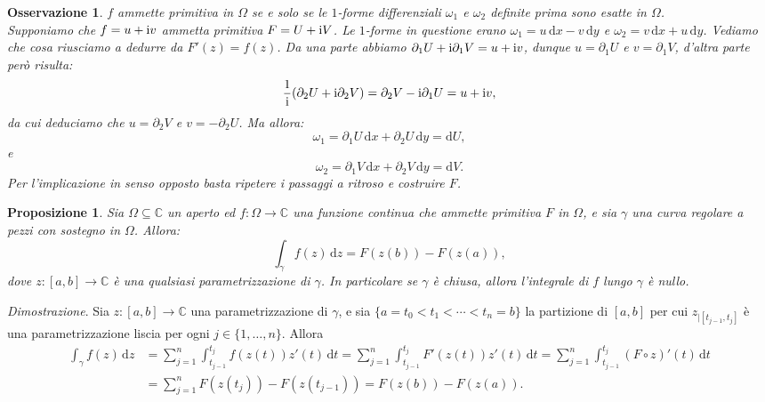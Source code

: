 \documentclass[11pt]{book}
\makeatletter
\theoremstyle{Definizione}
\theoremstyle{TeoremaProposizioneLemmaCorollarioCongettura}
\newtheorem{mypropo}[myteo]{Proposizione}
\theoremstyle{OsservazioneNotaEsempio}
\newtheorem{myobs}{Osservazione}[section]
\renewenvironment{proof}[1][\proofname]{\par
  \normalfont \topsep6\p@\@plus6\p@\relax
  \trivlist
  \item[\hskip\labelsep
        \itshape
    #1\@addpunct{.}]\ignorespaces
}{%
  \endtrivlist\@endpefalse
}
\renewenvironment{proof}{\textsl{Dimostrazione}.}{}
\newcommand{\C}{\mathbb{C}}
\newcommand{\sub}[2]{{#1}_{|{#2}}}
\renewcommand{\i}{\textup{i}}
\renewcommand{\d}{\mathrm{d}}
\newcommand{\dz}{\,\d z}
\newcommand{\dt}{\,\d t}
\newcommand{\dx}{\,\d x}
\newcommand{\dy}{\,\d y}
\makeatother
\begin{document}
\begin{myobs}
$f$ ammette primitiva in $\Omega$ se e solo se le $1$-forme differenziali $\omega_1$ e $\omega_2$ definite prima sono esatte in $\Omega$.\\
Supponiamo che $f = u+\i v$ ammetta primitiva $F = U+\i V$. Le $1$-forme in questione erano $\omega_1 = u\dx-v\dy$ e $\omega_2 = v\dx+u\dy$. Vediamo che cosa riusciamo a dedurre da $F'(z) = f(z)$. Da una parte abbiamo $\partial_1 U +\i \partial_1 V = u+\i v$, dunque $u = \partial_1 U$ e $v = \partial_1 V$, d'altra parte però risulta:
$$
\frac{1}{\i} (\partial_2 U+\i \partial_2V) = \partial_2 V-\i \partial_1 U = u+\i v,
$$
da cui deduciamo che $u = \partial_2 V$ e $v = -\partial_2 U$. Ma allora:
$$
\omega_1 = \partial_1 U \dx + \partial_2 U \dy = \d U,
$$
e
$$
\omega_2 = \partial_1 V \dx + \partial_2 V \dy = \d V.
$$
Per l'implicazione in senso opposto basta ripetere i passaggi a ritroso e costruire $F$.
\end{myobs}
\begin{boxpro}
\begin{mypropo}\label{pro:OlomorfaPrimitivaIntegraleFormulaZeroCurvaChiusa}
Sia $\Omega\subseteq \C$ un aperto ed $f:\Omega\longrightarrow \C$ una funzione continua che ammette primitiva $F$ in $\Omega$, e sia $\gamma$ una curva regolare a pezzi con sostegno in $\Omega$. Allora:
$$
\int_\gamma f(z)\dz = F(z(b))-F(z(a)),
$$
dove $z:[a,b]\longrightarrow \C$ è una qualsiasi parametrizzazione di $\gamma$. In particolare se $\gamma$ è chiusa, allora l'integrale di $f$ lungo $\gamma$ è nullo.
\end{mypropo}
\tcblower
\begin{proof}
Sia $z:[a,b]\longrightarrow \C$ una parametrizzazione di $\gamma$, e sia $\{a = t_0 < t_1 < \cdots < t_n = b\}$ la partizione di $[a,b]$ per cui $\sub{z}{[t_{j-1},t_j]}$ è una parametrizzazione liscia per ogni $j \in \{1,\dots,n\}$. Allora
\begin{align*}
\int_\gamma f(z)\dz &= \sum_{j = 1}^n \int_{t_{j-1}}^{t_j} f(z(t))z'(t) \dt = \sum_{j = 1}^n \int_{t_{j-1}}^{t_j} F'(z(t))z'(t)\dt = \sum_{j = 1}^n \int_{t_{j-1}}^{t_j}(F\circ z)'(t)\dt\\
&= \sum_{j = 1}^n F(z(t_j)) - F(z(t_{j-1})) = F(z(b))-F(z(a)).
\end{align*}
\end{proof}
\end{boxpro}
\end{document}
